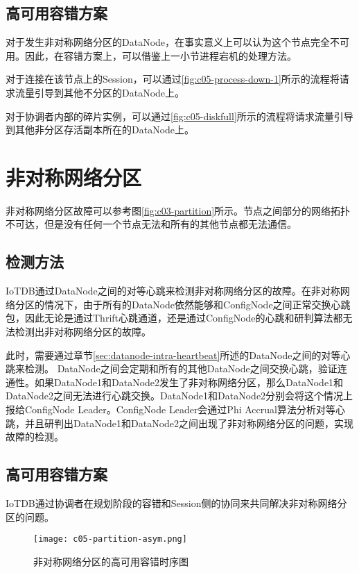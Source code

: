 \subsection{高可用容错方案}

对于发生非对称网络分区的DataNode，在事实意义上可以认为这个节点完全不可用。因此，在容错方案上，可以借鉴上一小节进程宕机的处理方法。

对于连接在该节点上的Session，可以通过\ref{fig:c05-process-down-1}所示的流程将请求流量引导到其他不分区的DataNode上。

对于协调者内部的碎片实例，可以通过\ref{fig:c05-diskfull}所示的流程将请求流量引导到其他非分区存活副本所在的DataNode上。


\section{非对称网络分区}

非对称网络分区故障可以参考图\ref{fig:c03-partition}所示。节点之间部分的网络拓扑不可达，但是没有任何一个节点无法和所有的其他节点都无法通信。

\subsection{检测方法}

IoTDB通过DataNode之间的对等心跳来检测非对称网络分区的故障。在非对称网络分区的情况下，由于所有的DataNode依然能够和ConfigNode之间正常交换心跳包，因此无论是通过Thrift心跳通道，还是通过ConfigNode的心跳和研判算法都无法检测出非对称网络分区的故障。

此时，需要通过章节\ref{sec:datanode-intra-heartbeat}所述的DataNode之间的对等心跳来检测。
DataNode之间会定期和所有的其他DataNode之间交换心跳，验证连通性。如果DataNode1和DataNode2发生了非对称网络分区，那么DataNode1和DataNode2之间无法进行心跳交换。DataNode1和DataNode2分别会将这个情况上报给ConfigNode Leader。ConfigNode Leader会通过Phi Accrual算法分析对等心跳，并且研判出DataNode1和DataNode2之间出现了非对称网络分区的问题，实现故障的检测。


\subsection{高可用容错方案}

IoTDB通过协调者在规划阶段的容错和Session侧的协同来共同解决非对称网络分区的问题。

\begin{figure}
    \centering
    \texttt{[image: c05-partition-asym.png]}
    \caption{非对称网络分区的高可用容错时序图}
    \label{fig:c05-partition-asym}
\end{figure}

